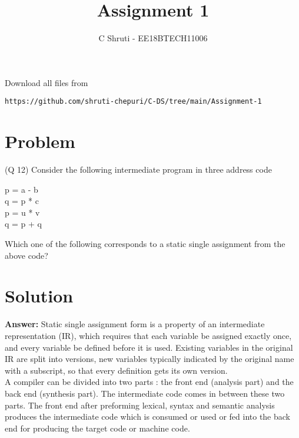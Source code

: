 \documentclass[journal,12pt,twocolumn]{IEEEtran}
\begin{document}
     \def\rightbox#1{\makebox[0in][r]{#1}}
     \def\centbox#1{\makebox[0in]{#1}}
     \def\topbox#1{\raisebox{-\baselineskip}[0in][0in]{#1}}
     \def\midbox#1{\raisebox{-0.5\baselineskip}[0in][0in]{#1}}
\vspace{3cm}
\title{Assignment 1}
\author{C Shruti - EE18BTECH11006}
\maketitle
\newpage
\bigskip
\renewcommand{\thefigure}{\theenumi}
\renewcommand{\thetable}{\theenumi}
Download all files from 
%
\begin{lstlisting}
https://github.com/shruti-chepuri/C-DS/tree/main/Assignment-1
\end{lstlisting}
\section{Problem}
(Q 12) Consider the following intermediate program in three address code
\begin{tcolorbox}[colback=gray!50!white]
p  = a - b \\
q = p * c \\
p = u * v \\
q = p + q \\
\end{tcolorbox}
Which one of the following corresponds to a static single assignment from the above code?
\section{Solution}
\textbf{Answer:} 
\newline
Static single assignment form is a property of an intermediate representation (IR), which requires that each variable be assigned exactly once, and every variable be defined before it is used. Existing variables in the original IR are split into versions, new variables typically indicated by the original name with a subscript, so that every definition gets its own version.\\

 A compiler can be divided into two parts : the front end (analysis part) and the back end (synthesis part). The intermediate code comes in between these two parts. The front end after preforming lexical, syntax and semantic analysis produces the intermediate code which is consumed or used or fed into the back end for producing the target code or machine code. \\
 
\end{document}
